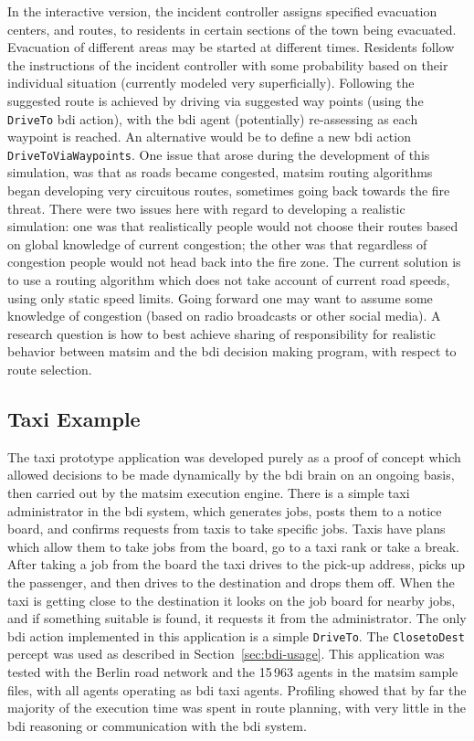 In the interactive version, the incident controller assigns specified
evacuation centers, and routes, to residents in certain sections of
the town being evacuated. Evacuation of different areas may be started
at different times. Residents follow the instructions of the incident
controller with some probability based on their individual situation
(currently modeled very superficially). Following the suggested route
is achieved by driving via suggested way points  (using the \lstinline{DriveTo} \gls{bdi}
action),  with the \gls{bdi} agent (potentially) re-assessing as each
waypoint is reached. An alternative would be to define a new \gls{bdi}
action \lstinline{DriveToViaWaypoints}. One issue that arose during the
development of this simulation, was that as roads became congested,
\gls{matsim} routing algorithms began developing very circuitous routes,
sometimes going back towards the fire threat. There were two issues
here with regard to developing a realistic simulation: one was that
realistically people would not choose their routes based on global
knowledge of current congestion; the other was that regardless of
congestion people would not head back into the fire zone. The current
solution is to use a routing algorithm which does not take account of
current road speeds, using only static speed limits. Going forward one
may want to assume some knowledge of congestion (based on radio
broadcasts or other social media). A research question is how to best
achieve sharing of responsibility for realistic behavior between
\gls{matsim} and the \gls{bdi} decision making program, with respect to route
selection. 

\subsection{Taxi Example}
The taxi prototype application was developed purely as a proof of
concept which allowed decisions to be made dynamically by the \gls{bdi}
brain on an ongoing basis, then carried out by the \gls{matsim} execution
engine. There is a simple taxi administrator in the \gls{bdi} system, which
generates jobs, posts them to a notice board, and confirms requests
from taxis to take specific jobs. Taxis have plans which allow them to
take jobs from the board, go to a taxi rank or take a break. After
taking a job from the board the taxi drives to the pick-up address,
picks up the passenger, and then drives to the destination and drops
them off. When the taxi is getting close to the destination it looks
on the job board for nearby jobs, and if something suitable is found,
it requests it from the administrator. The only \gls{bdi} action implemented
in this application is a simple \lstinline{DriveTo}. The
\lstinline{ClosetoDest} percept was used as described in Section~\ref{sec:bdi-usage}. 
This application was tested with the Berlin road network
and the 15\,963 agents in the \gls{matsim} sample files, with all agents
operating as \gls{bdi} taxi agents. Profiling showed that by far the
majority of the execution time was spent in route planning, with very
little in the \gls{bdi} reasoning or communication with the \gls{bdi} system.

